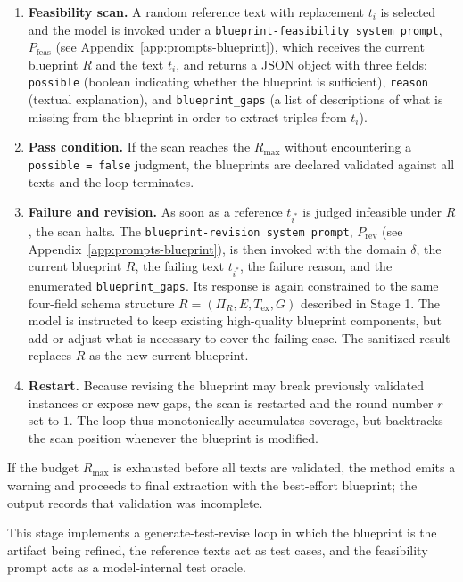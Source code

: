 \begin{enumerate}
  \item \textbf{Feasibility scan.} A random reference text with replacement $t_i$ is selected and the model is invoked under a \texttt{blueprint-feasibility system prompt}, $P_{\mathrm{feas}}$ (see Appendix~\ref{app:prompts-blueprint}), which receives the current blueprint $R$ and the text $t_i$, and returns a JSON object with three fields: \texttt{possible} (boolean indicating whether the blueprint is sufficient), \texttt{reason} (textual explanation), and \texttt{blueprint\_gaps} (a list of descriptions of what is missing from the blueprint in order to extract triples from $t_i$).

  \item \textbf{Pass condition.} If the scan reaches the $R_{\max}$ without encountering a \texttt{possible = false} judgment, the blueprints are declared validated against all texts and the loop terminates.

  \item \textbf{Failure and revision.} As soon as a reference $t_{i^*}$ is judged infeasible under $R$, the scan halts. The \texttt{blueprint-revision system prompt}, $P_{\mathrm{rev}}$ (see Appendix~\ref{app:prompts-blueprint}), is then invoked with the domain $\delta$, the current blueprint $R$, the failing text $t_{i^*}$, the failure reason, and the enumerated \texttt{blueprint\_gaps}. Its response is again constrained to the same four-field schema structure $R = (\Pi_R, E, T_{\mathrm{ex}}, G)$ described in Stage 1. The model is instructed to keep existing high-quality blueprint components, but add or adjust what is necessary to cover the failing case. The sanitized result replaces $R$ as the new current blueprint.

  \item \textbf{Restart.} Because revising the blueprint may break previously validated instances or expose new gaps, the scan is restarted and the round number $r$ set to $1$. The loop thus monotonically accumulates coverage, but backtracks the scan position whenever the blueprint is modified.
\end{enumerate}

If the budget $R_{\max}$ is exhausted before all texts are validated, the method emits a warning and proceeds to final extraction with the best-effort blueprint; the output records that validation was incomplete.

This stage implements a generate-test-revise loop in which the blueprint is the artifact being refined, the reference texts act as test cases, and the feasibility prompt acts as a model-internal test oracle.


